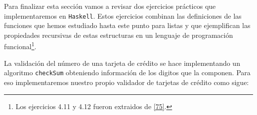     \newpage

    Para finalizar esta sección vamos a revisar dos ejercicios prácticos que implementaremos en \texttt{Haskell}. Estos ejercicios combinan las definiciones de las funciones que hemos estudiado hasta este punto para listas y que ejemplifican las propiedades recursivas de estas estructuras en un lenguaje de programación funcional\footnote{Los ejercicios 4.11 y 4.12 fueron extraidos de \hyperlink{75}{[75]}.}.

    \bigskip

    \begin{exercise}
        La validación del número de una tarjeta de crédito se hace implementando un algoritmo \texttt{checkSum} obteniendo información de los digitos que la componen. Para eso implementaremos nuestro propio validador de tarjetas de crédito como sigue:\\
    

\end{exercise}
